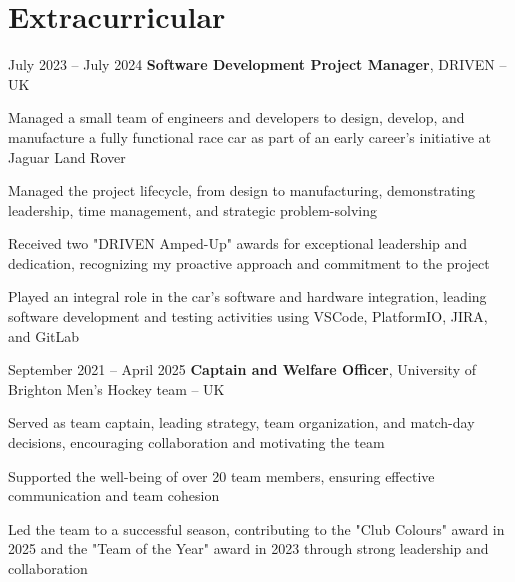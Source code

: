 	\section{Extracurricular}
	
	
	\begin{twocolentry}{
			July 2023 – July 2024
		}
		\textbf{Software Development Project Manager}, DRIVEN -- UK
	\end{twocolentry}
	
	\vspace{0.10 cm}
	\begin{onecolentry}
		\begin{highlights}
			\item Managed a small team of engineers and developers to design, develop, and manufacture a fully functional race car as part of an early career’s initiative at Jaguar Land Rover
			\item Managed the project lifecycle, from design to manufacturing, demonstrating leadership, time management, and strategic problem-solving
			\item Received two "DRIVEN Amped-Up" awards for exceptional leadership and dedication, recognizing my proactive approach and commitment to the project
			\item Played an integral role in the car's software and hardware integration, leading software development and testing activities using VSCode, PlatformIO, JIRA, and GitLab
		\end{highlights}
	\end{onecolentry}
	
	
	\vspace{0.2 cm}
	
	\begin{twocolentry}{
			September 2021 – April 2025
		}
		\textbf{Captain and Welfare Officer}, University of Brighton Men’s Hockey team -- UK
	\end{twocolentry}
	
	\vspace{0.10 cm}
	\begin{onecolentry}
		\begin{highlights}
			\item Served as team captain, leading strategy, team organization, and match-day decisions, encouraging collaboration and motivating the team
			\item Supported the well-being of over 20 team members, ensuring effective communication and team cohesion
			\item Led the team to a successful season, contributing to the "Club Colours" award in 2025 and the "Team of the Year" award in 2023 through strong leadership and collaboration
		\end{highlights}
	\end{onecolentry}
	
